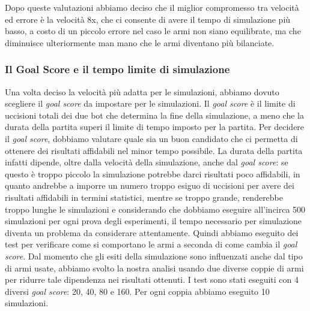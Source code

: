 \documentclass[12pt, italian]{toptesi}
\begin{document}
Dopo queste valutazioni abbiamo deciso che il miglior compromesso tra velocità ed errore è la velocità 8x, che ci consente di avere il tempo di simulazione più basso, a costo di un piccolo errore nel caso le armi non siano equilibrate, ma che diminuisce ulteriormente man mano che le armi diventano più bilanciate.

\subsubsection{Il Goal Score e il tempo limite di simulazione}
\label{sec:goal_score}
Una volta deciso la velocità più adatta per le simulazioni, abbiamo dovuto scegliere il \emph{goal score} da impostare per le simulazioni.
Il \emph{goal score} è il limite di uccisioni totali dei due bot che determina la fine della simulazione, a meno che la durata della partita superi il limite di tempo imposto per la partita.
Per decidere il \emph{goal score}, dobbiamo valutare quale sia un buon candidato che ci permetta di ottenere dei risultati affidabili nel minor tempo possibile. 
La durata della partita infatti dipende, oltre dalla velocità della simulazione, anche dal \emph{goal score}: se questo è troppo piccolo la simulazione potrebbe darci risultati poco affidabili, in quanto andrebbe a imporre un numero troppo esiguo di uccisioni per avere dei risultati affidabili in termini statistici, mentre se troppo grande, renderebbe troppo lunghe le simulazioni e considerando che dobbiamo eseguire all'incirca 500 simulazioni per ogni prova degli esperimenti, il tempo necessario per simulazione diventa un problema da considerare attentamente.
Quindi abbiamo eseguito dei test per verificare come si comportano le armi a seconda di come cambia il \emph{goal score}.
Dal momento che gli esiti della simulazione sono influenzati anche dal tipo di armi usate, abbiamo svolto la nostra analisi usando due diverse coppie di armi per ridurre tale dipendenza nei risultati ottenuti.
I test sono stati eseguiti con 4 diversi \emph{goal score}: 20, 40, 80 e 160. Per ogni coppia abbiamo eseguito 10 simulazioni.
\end{document}
